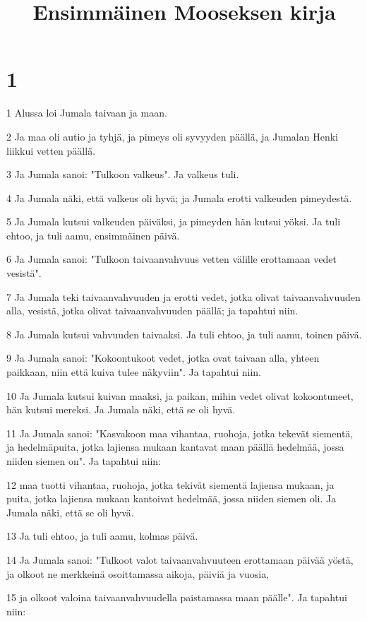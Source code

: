 

\title{Ensimmäinen Mooseksen kirja}


\chapter{1}

\par 1 Alussa loi Jumala taivaan ja maan.
\par 2 Ja maa oli autio ja tyhjä, ja pimeys oli syvyyden päällä, ja Jumalan Henki liikkui vetten päällä.
\par 3 Ja Jumala sanoi: "Tulkoon valkeus". Ja valkeus tuli.
\par 4 Ja Jumala näki, että valkeus oli hyvä; ja Jumala erotti valkeuden pimeydestä.
\par 5 Ja Jumala kutsui valkeuden päiväksi, ja pimeyden hän kutsui yöksi. Ja tuli ehtoo, ja tuli aamu, ensimmäinen päivä.
\par 6 Ja Jumala sanoi: "Tulkoon taivaanvahvuus vetten välille erottamaan vedet vesistä".
\par 7 Ja Jumala teki taivaanvahvuuden ja erotti vedet, jotka olivat taivaanvahvuuden alla, vesistä, jotka olivat taivaanvahvuuden päällä; ja tapahtui niin.
\par 8 Ja Jumala kutsui vahvuuden taivaaksi. Ja tuli ehtoo, ja tuli aamu, toinen päivä.
\par 9 Ja Jumala sanoi: "Kokoontukoot vedet, jotka ovat taivaan alla, yhteen paikkaan, niin että kuiva tulee näkyviin". Ja tapahtui niin.
\par 10 Ja Jumala kutsui kuivan maaksi, ja paikan, mihin vedet olivat kokoontuneet, hän kutsui mereksi. Ja Jumala näki, että se oli hyvä.
\par 11 Ja Jumala sanoi: "Kasvakoon maa vihantaa, ruohoja, jotka tekevät siementä, ja hedelmäpuita, jotka lajiensa mukaan kantavat maan päällä hedelmää, jossa niiden siemen on". Ja tapahtui niin:
\par 12 maa tuotti vihantaa, ruohoja, jotka tekivät siementä lajiensa mukaan, ja puita, jotka lajiensa mukaan kantoivat hedelmää, jossa niiden siemen oli. Ja Jumala näki, että se oli hyvä.
\par 13 Ja tuli ehtoo, ja tuli aamu, kolmas päivä.
\par 14 Ja Jumala sanoi: "Tulkoot valot taivaanvahvuuteen erottamaan päivää yöstä, ja olkoot ne merkkeinä osoittamassa aikoja, päiviä ja vuosia,
\par 15 ja olkoot valoina taivaanvahvuudella paistamassa maan päälle". Ja tapahtui niin:
